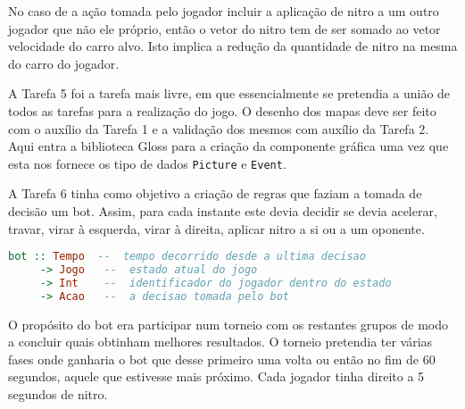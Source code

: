 No caso de a ação tomada pelo jogador incluir a aplicação de nitro a um outro
jogador que não ele próprio, então o vetor do nitro tem de ser somado ao vetor
velocidade do carro alvo. Isto implica a redução da quantidade de nitro na mesma
do carro do jogador.

A Tarefa 5 foi a tarefa mais livre, em que essencialmente se pretendia a união
de todos as tarefas para a realização do jogo. O desenho dos mapas deve ser
feito com o auxílio da Tarefa 1 e a validação dos mesmos com auxílio da Tarefa 2.
Aqui entra a biblioteca Gloss para a criação da componente gráfica uma vez que
esta nos fornece os tipo de dados \texttt{Picture} e \texttt{Event}.

A Tarefa 6 tinha como objetivo a criação de regras que faziam a tomada de
decisão um bot. Assim, para cada instante este devia decidir se devia acelerar,
travar, virar à esquerda, virar à direita, aplicar nitro a si ou a um oponente.

\begin{lstlisting}[language=Haskell]
 bot :: Tempo  --  tempo decorrido desde a ultima decisao
     -> Jogo   --  estado atual do jogo
     -> Int    --  identificador do jogador dentro do estado
     -> Acao   --  a decisao tomada pelo bot
\end{lstlisting}

O propósito do bot era participar num torneio com os restantes grupos de modo a
concluir quais obtinham melhores resultados. O torneio pretendia ter várias
fases onde ganharia o bot que desse primeiro uma volta ou então no fim de 60
segundos, aquele que estivesse mais próximo. Cada jogador tinha direito a 5
segundos de nitro.
